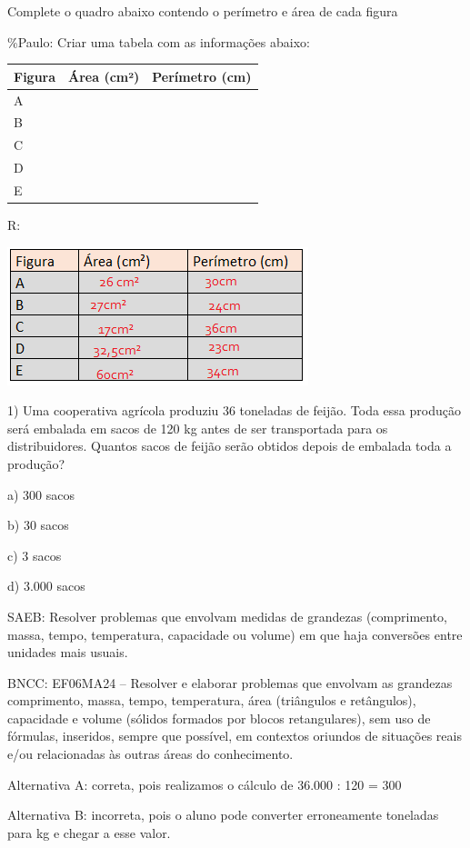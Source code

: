Complete o quadro abaixo contendo o perímetro e área de cada figura

\%Paulo: Criar uma tabela com as informações abaixo:

\begin{longtable}[]{@{}lll@{}}
\toprule
Figura & Área (cm²) & Perímetro (cm)\tabularnewline
\midrule
\endhead
A & ~ & ~\tabularnewline
B & ~ & ~\tabularnewline
C & ~ & ~\tabularnewline
D & ~ & ~\tabularnewline
E & ~ & ~\tabularnewline
\bottomrule
\end{longtable}

R:

\includegraphics[width=3.44792in,height=1.58333in]{./imgSAEB_6_MAT/media/image99.png}


1) Uma cooperativa agrícola produziu 36 toneladas de feijão. Toda essa
produção será embalada em sacos de 120 kg antes de ser transportada para
os distribuidores. Quantos sacos de feijão serão obtidos depois de
embalada toda a produção?

a) 300 sacos

b) 30 sacos

c) 3 sacos

d) 3.000 sacos

SAEB: Resolver problemas que envolvam medidas de grandezas (comprimento,
massa, tempo, temperatura, capacidade ou volume) em que haja conversões
entre unidades mais usuais.

BNCC: EF06MA24 -- Resolver e elaborar problemas que envolvam as
grandezas comprimento, massa, tempo, temperatura, área (triângulos e
retângulos), capacidade e volume (sólidos formados por blocos
retangulares), sem uso de fórmulas, inseridos, sempre que possível, em
contextos oriundos de situações reais e/ou relacionadas às outras áreas
do conhecimento.

Alternativa A: correta, pois realizamos o cálculo de 36.000 : 120 = 300

Alternativa B: incorreta, pois o aluno pode converter erroneamente
toneladas para kg e chegar a esse valor.

